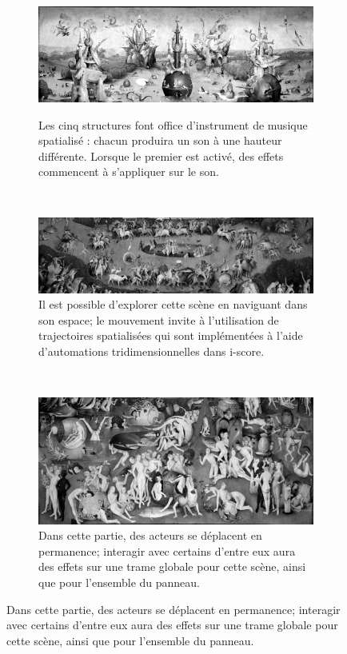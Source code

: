 \begin{subfigure}[t]{\textwidth}
    \centering
    \begin{subfigure}[t]{\textwidth}
\centering
\includegraphics[width=\textwidth]{images/B1.png}
\label{fig.b1}
\caption{Les cinq structures font office d'instrument de musique spatialisé : chacun produira un son à une hauteur différente. Lorsque le premier est activé, des effets commencent à s'appliquer sur le son.}
    \end{subfigure}~\\   
    \begin{subfigure}[t]{\textwidth}
\centering
\includegraphics[width=\textwidth]{images/B2.png}
\caption{Il est possible d'explorer cette scène en naviguant dans son espace; le mouvement invite à l'utilisation de trajectoires spatialisées qui sont implémentées à l'aide d'automations tridimensionnelles dans i-score.}
\label{fig.b2}
    \end{subfigure}~\\  
    \begin{subfigure}[t]{\textwidth}
\centering
\includegraphics[width=\textwidth]{images/B3.png}
\caption{Dans cette partie, des acteurs se déplacent en permanence; interagir avec certains d'entre eux aura des effets sur une trame globale pour cette scène, ainsi que pour l'ensemble du panneau.}
\label{fig.b3}
    \end{subfigure}  
    \label{fig.b}
\end{subfigure}